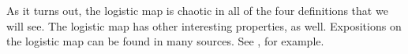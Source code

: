 \documentclass[10pt,twoside,draft]{book}
\begin{document}
As it turns out, the logistic map is chaotic in all of the four definitions that we will see.
The logistic map has other interesting properties, as well.
Expositions on the logistic map can be found in many sources.
See \citep{may1, may2, devaney}, for example.




\end{document}
